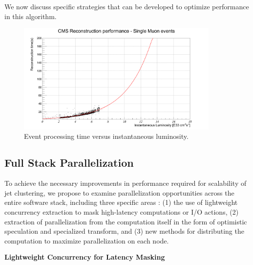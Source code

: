 \documentclass[12pt]{article}
\begin{document}
We now discuss specific strategies that can be developed 
to optimize performance in this algorithm. 

\begin{figure}[h!]
    \centering
    \includegraphics[width=100mm]{lumitpeSingleMu-fitted2.png}
    \caption{\label{lumitpeSingleMu} Event processing time versus
      instantaneous luminosity.}
\end{figure}



\subsection{Full Stack Parallelization}

To achieve the necessary improvements in performance required for scalability
of jet clustering, we propose to examine parallelization opportunities across
the entire software stack, including three specific areas : 
(1) the use of lightweight concurrency
extraction to mask high-latency computations or I/O actions, 
(2) extraction of
parallelization from the computation itself in the form of optimistic speculation
and specialized transform, and
(3) new methods for distributing the computation to
maximize parallelization on each node. 


\bigskip
\noindent
{\bf  Lightweight Concurrency for Latency Masking}
\bigskip
\end{document}
